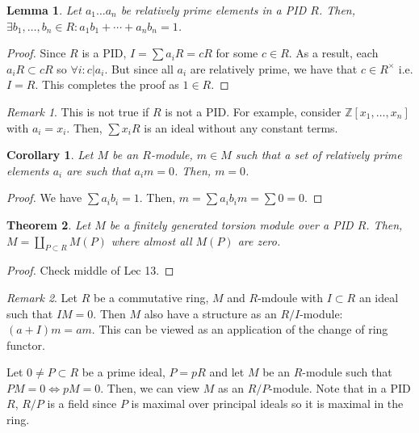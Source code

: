 \documentclass{article}
\newcommand\Z{\ensuremath{\mathbb{Z}}}
\newtheorem{theorem}{Theorem}[section]
\newtheorem{corollary}{Corollary}[theorem]
\newtheorem{lemma}[theorem]{Lemma}
\theoremstyle{definition}
\theoremstyle{remark}
\newtheorem*{remark}{Remark}
\theoremstyle{plain}
\begin{document}
\begin{lemma}
    Let \(a_1 \ldots a_n\) be relatively prime elements in a PID \(R\). Then, 
    \(\exists b_1, \ldots, b_n \in R: a_1b_1 + \cdots + a_nb_n = 1\).
\end{lemma}
\begin{proof}
    Since \(R\) is a PID, \(I = \sum a_iR = cR\) for some \(c \in R\). As a result, each \(a_iR \subset cR\) so \(\forall i: c| a_i\). 
    But since all \(a_i\) are relatively prime, we have that \(c \in R^{\times}\) i.e. \(I = R\). This completes the proof as \(1 \in R\).
\end{proof}

\begin{remark}
    This is not true if \(R\) is not a PID. For example, consider \(\Z[x_1, \ldots, x_n]\) with \(a_i = x_i\).
    Then, \(\sum x_i R\) is an ideal without any constant terms. 
\end{remark}

\begin{corollary}
    Let \(M\) be an \(R\)-module, \(m \in M\) such that a set of relatively prime elements \(a_i\) are such that \(a_im = 0\).
    Then, \(m = 0\).
\end{corollary}
\begin{proof}
    We have \(\sum a_ib_i = 1\). Then, \(m = \sum a_i b_i m = \sum 0 = 0\).
\end{proof}

\begin{theorem}
    Let \(M\) be a finitely generated torsion module over a PID \(R\). Then, \(M = \coprod\limits_{P \subset R}
    M(P)\) where almost all \(M(P)\) are zero. 
\end{theorem}
\begin{proof}
    Check middle of Lec 13. 
\end{proof}

\begin{remark}
    Let \(R\) be a commutative ring, \(M\) and \(R\)-mdoule with \(I \subset R\) an ideal such that \(IM = 0\). Then \(M\) 
    also have a structure as an \(R/I\)-module: \((a+I)m = am\). This can be viewed as an application of the change of ring functor. 
\end{remark}

Let \(0 \neq P \subset R\) be a prime ideal, \(P = pR\) and let \(M\) be an \(R\)-module such that \(PM = 0 \iff pM = 0\). Then, we can view \(M\) as an \(R/P\)-module. 
Note that in a PID \(R\), \(R/P\) is a field since \(P\) is maximal over principal ideals so it is maximal in the ring. 
\end{document}
